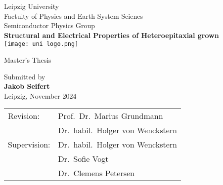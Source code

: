 \thispagestyle{empty}
\begin{center}
        \vspace{0.5cm}
        \large
        Leipzig University\\
        Factulty of Physics and Earth System Scienes\\
        Semiconductor Physics Group\\[2cm]
        \Huge
        \textbf{Structural and Electrical Properties of Heteroepitaxial grown \texorpdfstring{\cro}{Cr2O3}}\\[1.5cm]

        \texttt{[image: uni logo.png]}\\

        \vspace{1cm}
        
    
        \LARGE
        Master's Thesis\\
        
            
        \vspace{1cm}

        \normalsize
        Submitted by\\
        \LARGE
        \textbf{Jakob Seifert}\\[.5cm]
        \normalsize
        Leipzig, November 2024
        
        \vfill
            
            
        \vspace{0.8cm}
            
            
        \large
        \centering
        \begin{tabular}{ll}
            Revision:       & Prof.\ Dr.\ Marius Grundmann\\
                            & Dr.\ habil.\ Holger von Wenckstern\\[1cm]
            Supervision:    & Dr.\ habil.\ Holger von Wenckstern\\
                            & Dr.\ Sofie Vogt\\
                            & Dr.\ Clemens Petersen
        \end{tabular}
        
        
        
            
    \end{center}